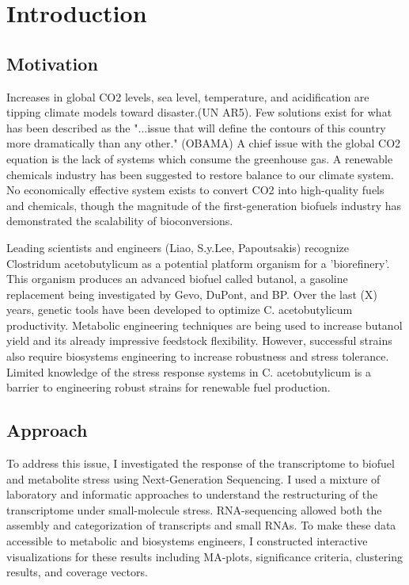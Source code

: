 %
%
\chapter{Introduction}


\section{Motivation}
Increases in global CO2 levels, sea level, temperature, and acidification are tipping climate models toward disaster.(UN AR5). Few solutions exist for what has been described as the "...issue that will define the contours of this country more dramatically than any other." (OBAMA) A chief issue with the global CO2 equation is the lack of systems which consume the greenhouse gas. A renewable chemicals industry has been suggested to restore balance to our climate system. No economically effective system exists to convert CO2 into high-quality fuels and chemicals, though the magnitude of the first-generation biofuels industry has demonstrated the scalability of bioconversions.

Leading scientists and engineers (Liao, S.y.Lee, Papoutsakis) recognize Clostridum acetobutylicum as a potential platform organism for a 'biorefinery'. This organism produces an advanced biofuel called butanol, a gasoline replacement being investigated by Gevo, DuPont, and BP. Over the last (X) years, genetic tools have been developed to optimize C. acetobutylicum productivity. Metabolic engineering techniques are being used to increase butanol yield and its already impressive feedstock flexibility. However, successful strains also require biosystems engineering to increase robustness and stress tolerance. Limited knowledge of the stress response systems in C. acetobutylicum is a barrier to engineering robust strains for renewable fuel production.

\section{Approach}
To address this issue, I investigated the response of the transcriptome to biofuel and metabolite stress using Next-Generation Sequencing. I used a mixture of laboratory and informatic approaches to understand the restructuring of the transcriptome under small-molecule stress. RNA-sequencing allowed both the assembly and categorization of transcripts and small RNAs. To make these data accessible to metabolic and biosystems engineers, I constructed interactive visualizations for these results including MA-plots, significance criteria, clustering results, and coverage vectors.

